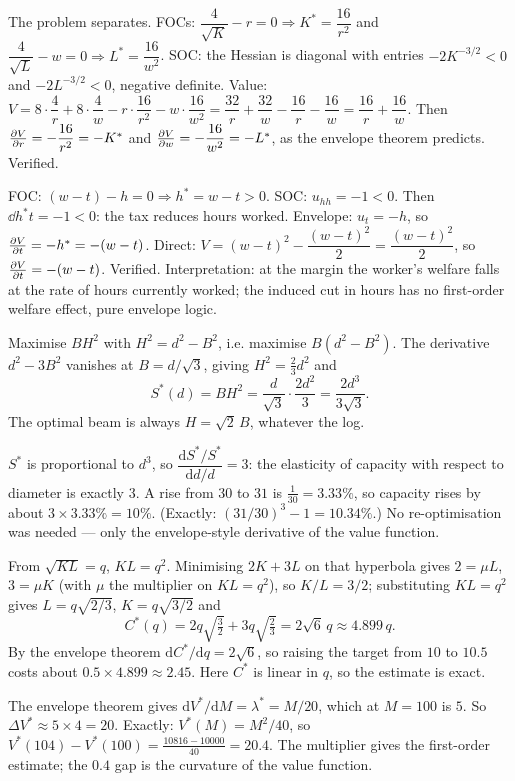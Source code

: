 \begin{solutions}
  \item The problem separates. FOCs:
        $\dfrac{4}{\sqrt K}-r=0\Rightarrow K^*=\dfrac{16}{r^2}$ and
        $\dfrac{4}{\sqrt L}-w=0\Rightarrow L^*=\dfrac{16}{w^2}$. SOC:
        the Hessian is diagonal with entries $-2K^{-3/2}<0$ and
        $-2L^{-3/2}<0$, negative definite. Value:
        $V=8\cdot\dfrac4r+8\cdot\dfrac4w-r\cdot\dfrac{16}{r^2}
        -w\cdot\dfrac{16}{w^2}
        =\dfrac{32}r+\dfrac{32}w-\dfrac{16}r-\dfrac{16}w
        =\dfrac{16}r+\dfrac{16}w$. Then
        $\frac{\partial V}{\partial r}=-\dfrac{16}{r^2}=-K^*$ and
        $\frac{\partial V}{\partial w}=-\dfrac{16}{w^2}=-L^*$, as the envelope theorem
        predicts. Verified.

  \item FOC: $(w-t)-h=0\Rightarrow h^*=w-t>0$. SOC: $u_{hh}=-1<0$.
        Then $\dd{h^*}{t}=-1<0$: the tax reduces hours worked.
        Envelope: $u_t=-h$, so $\frac{\partial V}{\partial t}=-h^*=-(w-t)$. Direct:
        $V=(w-t)^2-\dfrac{(w-t)^2}{2}=\dfrac{(w-t)^2}{2}$, so
        $\frac{\partial V}{\partial t}=-(w-t)$. Verified. Interpretation: at the margin the
        worker's welfare falls at the rate of hours currently worked;
        the induced cut in hours has no first-order welfare effect,
        pure envelope logic.

  \item Maximise $BH^{2}$ with $H^{2}=d^{2}-B^{2}$, i.e. maximise
        $B(d^{2}-B^{2})$. The derivative $d^{2}-3B^{2}$ vanishes at
        $B=d/\sqrt3$, giving $H^{2}=\tfrac23 d^{2}$ and
        \[
          S^{*}(d)=B H^{2}=\frac{d}{\sqrt3}\cdot\frac{2d^{2}}{3}
                  =\frac{2d^{3}}{3\sqrt3}.
        \]
        The optimal beam is always $H=\sqrt2\,B$, whatever the log.
  \item $S^{*}$ is proportional to $d^{3}$, so
        $\dfrac{\mathrm{d}S^{*}/S^{*}}{\mathrm{d}d/d}=3$: the elasticity of
        capacity with respect to diameter is exactly $3$. A rise from $30$
        to $31$ is $\tfrac{1}{30}=3.33\%$, so capacity rises by about
        $3\times3.33\%=10\%$. (Exactly:
        $(31/30)^{3}-1=10.34\%$.) No re-optimisation was needed --- only the
        envelope-style derivative of the value function.
  \item From $\sqrt{KL}=q$, $KL=q^{2}$. Minimising $2K+3L$ on that
        hyperbola gives $2=\mu L$, $3=\mu K$ (with $\mu$ the multiplier on
        $KL=q^{2}$), so $K/L=3/2$; substituting $KL=q^{2}$ gives
        $L=q\sqrt{2/3}$, $K=q\sqrt{3/2}$ and
        \[
          C^{*}(q)=2q\sqrt{\tfrac32}+3q\sqrt{\tfrac23}=2\sqrt6\,q
          \approx4.899\,q .
        \]
        By the envelope theorem $\mathrm{d}C^{*}/\mathrm{d}q=2\sqrt6$, so
        raising the target from $10$ to $10.5$ costs about
        $0.5\times4.899\approx2.45$. Here $C^{*}$ is linear in $q$, so the
        estimate is exact.
  \item The envelope theorem gives
        $\mathrm{d}V^{*}/\mathrm{d}M=\lambda^{*}=M/20$, which at $M=100$ is
        $5$. So $\Delta V^{*}\approx5\times4=20$. Exactly:
        $V^{*}(M)=M^{2}/40$, so
        $V^{*}(104)-V^{*}(100)=\tfrac{10816-10000}{40}=20.4$. The
        multiplier gives the first-order estimate; the $0.4$ gap is the
        curvature of the value function.


\end{solutions}
